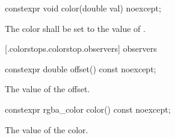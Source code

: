 %
\begin{itemdecl}
constexpr void color(double val) noexcept;
\end{itemdecl}
\begin{itemdescr}
	\pnum
	\effects
	The color shall be set to the value of .
\end{itemdescr}

 [\iotwod.colorstops.colorstop.observers]{ observers}

\begin{itemdecl}
	constexpr double offset() const noexcept;
\end{itemdecl}
\begin{itemdescr}
	\pnum
	\returns
	The value of the offset.
\end{itemdescr}

\begin{itemdecl}
	constexpr rgba_color color() const noexcept;
\end{itemdecl}
\begin{itemdescr}
	\pnum
	\returns
	The value of the color.
\end{itemdescr}
